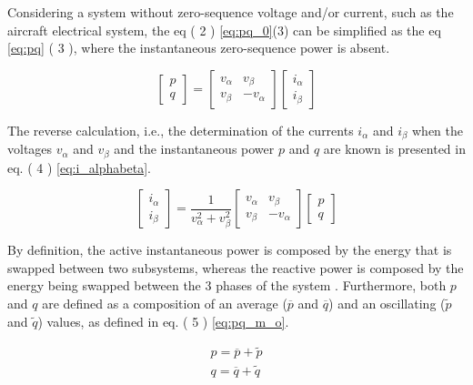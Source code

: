 Considering a system without zero-sequence voltage and/or current, such as the aircraft electrical system, the eq ( 2 )  \ref{eq:pq_0}(3) can be simplified as the eq \ref{eq:pq} ( 3 ), where the instantaneous zero-sequence power is absent.

\begin{equation}
\begin{bmatrix}
p\\
q
\end{bmatrix}=
\begin{bmatrix}
v_{\alpha}	&	v_{\beta}\\
v_{\beta}	&	-v_{\alpha}
\end{bmatrix}
\begin{bmatrix}
i_{\alpha}\\
i_{\beta}
\end{bmatrix}
\label{eq:pq}
\end{equation} 

The reverse calculation, i.e., the determination of the currents $i_{\alpha}$ and $i_{\beta}$ when the voltages $v_{\alpha}$ and $v_{\beta}$ and the instantaneous power $p$ and $q$ are known is presented in eq. ( 4 ) \ref{eq:i_alphabeta}.

\begin{equation}
\begin{bmatrix}
i_{\alpha}\\
i_{\beta}
\end{bmatrix}=
\dfrac{1}{v_{\alpha}^2+v_{\beta}^2}
\begin{bmatrix}
v_{\alpha}	&	v_{\beta}\\
v_{\beta}	&	-v_{\alpha}
\end{bmatrix}
\begin{bmatrix}
p\\
q
\end{bmatrix}
\label{eq:i_alphabeta}
\end{equation}

By definition, the active instantaneous power is composed by the energy that is swapped between two subsystems, whereas the reactive power is composed by the energy being swapped between the 3 phases of the system \cite{Akagi1984,Peng1996}. Furthermore, both $p$ and $q$ are defined as a composition of an average ($\overline{p}$ and $\overline{q}$) and an oscillating ($\tilde{p}$ and $\tilde{q}$) values, as defined in eq. ( 5 ) \ref{eq:pq_m_o}.

\begin{equation}
\begin{aligned}
p = \overline{p} + \tilde{p}\\
q = \overline{q} + \tilde{q} 
\end{aligned}
\label{eq:pq_m_o}
\end{equation} 

